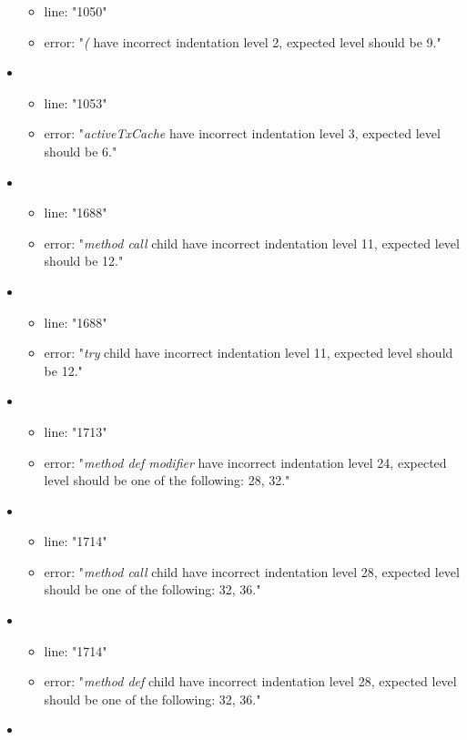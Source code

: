 \begin{itemize}
\begin{itemize}
		\item line: "1050" 
		\item error: "\emph{(} have incorrect indentation level 2, expected level should be 9." 
	\end{itemize}
	\item 
	\begin{itemize} 
		\item line: "1053" 
		\item error: "\emph{activeTxCache} have incorrect indentation level 3, expected level should be 6." 
	\end{itemize}
	\item 
	\begin{itemize} 
		\item line: "1688" 
		\item error: "\emph{method call} child have incorrect indentation level 11, expected level should be 12." 
	\end{itemize}
	\item 
	\begin{itemize} 
		\item line: "1688" 
		\item error: "\emph{try} child have incorrect indentation level 11, expected level should be 12." 
	\end{itemize}
	\item 
	\begin{itemize} 
		\item line: "1713" 
		\item error: "\emph{method def modifier} have incorrect indentation level 24, expected level should be one of the following: 28, 32." 
	\end{itemize}
	\item 
	\begin{itemize} 
		\item line: "1714" 
		\item error: "\emph{method call} child have incorrect indentation level 28, expected level should be one of the following: 32, 36." 
	\end{itemize}
	\item 
	\begin{itemize} 
		\item line: "1714" 
		\item error: "\emph{method def} child have incorrect indentation level 28, expected level should be one of the following: 32, 36." 
	\end{itemize}
	\item 
	\begin{itemize} 

\end{itemize}
\end{itemize}
